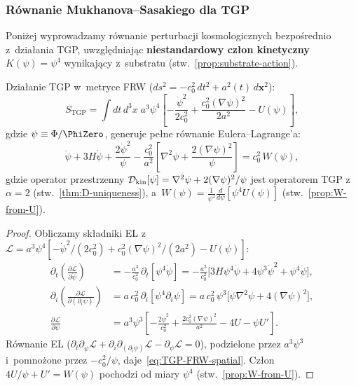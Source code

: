 

\subsubsection{R\'ownanie Mukhanova--Sasakiego dla TGP}\label{sssec:MS-TGP}

Poni\.zej wyprowadzamy r\'ownanie perturbacji kosmologicznych
bezpo\'srednio z~dzia\l{}ania TGP, uwzgl\k{e}dniaj\k{a}c
\textbf{niestandardowy cz\l{}on kinetyczny} $K(\psi) = \psi^4$
wynikaj\k{a}cy z~substratu (stw.~\ref{prop:substrate-action}).

\begin{proposition}%
\label{prop:TGP-FRW-full}
Dzia\l{}anie TGP w~metryce FRW ($ds^2 = -c_0^2\,dt^2 + a^2(t)\,d\mathbf{x}^2$):
\[
  S_{\mathrm{TGP}} = \int dt\,d^3x\;a^3\psi^4
  \!\left[
    -\frac{\dot\psi^2}{2c_0^2}
    + \frac{c_0^2(\nabla\psi)^2}{2a^2}
    - U(\psi)
  \right]\!,
\]
gdzie $\psi \equiv \Phi/\PhiZero$, generuje pe\l{}ne r\'ownanie Eulera--Lagrange'a:
\begin{equation}\label{eq:TGP-FRW-spatial}
  \boxed{
    \ddot\psi + 3H\dot\psi + \frac{2\dot\psi^2}{\psi}
    - \frac{c_0^2}{a^2}
      \!\left[\nabla^2\!\psi + \frac{2(\nabla\psi)^2}{\psi}\right]
    = c_0^2\,W(\psi),
  }
\end{equation}
gdzie operator przestrzenny $\mathcal{D}_{\rm kin}[\psi]
= \nabla^2\psi + 2(\nabla\psi)^2/\psi$
jest operatorem TGP z~$\alpha = 2$ (stw.~\ref{thm:D-uniqueness}),
a~$W(\psi) = \frac{1}{\psi^4}\frac{d}{d\psi}[\psi^4 U(\psi)]$
(stw.~\ref{prop:W-from-U}).
\end{proposition}

\begin{proof}
Obliczamy sk\l{}adniki EL z~$\mathcal{L} = a^3\psi^4
[-\dot\psi^2/(2c_0^2) + c_0^2(\nabla\psi)^2/(2a^2) - U(\psi)]$:
\begin{align*}
  \partial_t\!\left(\frac{\partial\mathcal{L}}{\partial\dot\psi}\right)
  &= -\frac{a^3}{c_0^2}\,\partial_t[\psi^4\dot\psi]
   = -\frac{a^3}{c_0^2}\bigl[3H\psi^4\dot\psi + 4\psi^3\dot\psi^2 + \psi^4\ddot\psi\bigr],\\
  \partial_i\!\left(\frac{\partial\mathcal{L}}{\partial(\partial_i\psi)}\right)
  &= a\,c_0^2\,\partial_i[\psi^4\partial_i\psi]
   = a\,c_0^2\,\psi^3\bigl[\psi\nabla^2\!\psi + 4(\nabla\psi)^2\bigr],\\
  \frac{\partial\mathcal{L}}{\partial\psi}
  &= a^3\psi^3\!\left[-\frac{2\dot\psi^2}{c_0^2}
     + \frac{2c_0^2(\nabla\psi)^2}{a^2}
     - 4U - \psi U'\right]\!.
\end{align*}
R\'ownanie EL ($\partial_t\partial_{\dot\psi}\mathcal{L}
+ \partial_i\partial_{(\partial_i\psi)}\mathcal{L}
- \partial_\psi\mathcal{L} = 0$), podzielone przez $a^3\psi^3$
i~pomno\.zone przez $-c_0^2/\psi$, daje~\eqref{eq:TGP-FRW-spatial}.
Cz\l{}on $4U/\psi + U' = W(\psi)$ pochodzi od miary $\psi^4$
(stw.~\ref{prop:W-from-U}).
\end{proof}

